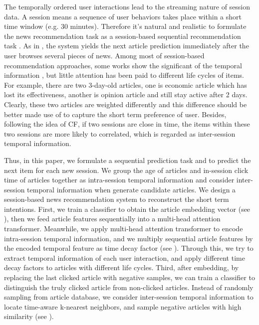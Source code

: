 The temporally ordered user interactions lead to the streaming nature of session data. A session means a sequence of user behaviors takes place within a short time window (e.g. 30 minutes). Therefore it's natural and realistic to formulate the news recommendation task as a session-based sequential recommendation task \cite{sottocornola2018session, epure_recommending_2017}. As in , the system yields the next article prediction immediately after the user browses several pieces of news. 
Among most of session-based recommendation approaches, some works show the significant of the temporal information \cite{garg2019sequence, rakkappan2019context, xu2019time}, but little attention has been paid to different life cycles of items. For example, there are two 3-day-old articles, one is economic article which has lost its effectiveness, another is opinion article and still stay active after 2 days. Clearly, these two articles are weighted differently and this difference should be better made use of to capture the short term preference of user. Besides, following the idea of CF, if two sessions are close in time, the items within these two sessions are more likely to correlated, which is regarded as inter-session temporal information.

Thus, in this paper, we formulate a sequential prediction task and to predict the next item for each new session. We group the age of articles and in-session click time of articles together as intra-session temporal information and consider inter-session temporal information when generate candidate articles. We design a session-based news recommendation system to reconstruct the short term intentions. First, we train a classifier to obtain the article embedding vector (see ), then we feed article features sequentially into a multi-head attention transformer. Meanwhile, we apply multi-head attention transformer to encode intra-session temporal information, and we multiply sequential article features by the encoded temporal feature as time decay factor (see ). Through this, we try to extract temporal information of each user interaction, and apply different time decay factors to articles with different life cycles. Third, after embedding, by replacing the last clicked article with negative samples, we can train a classifier to distinguish the truly clicked article from non-clicked articles. Instead of randomly sampling from article database, we consider inter-session temporal information to locate time-aware k-nearest neighbors, and sample negative articles with high similarity (see ). 

